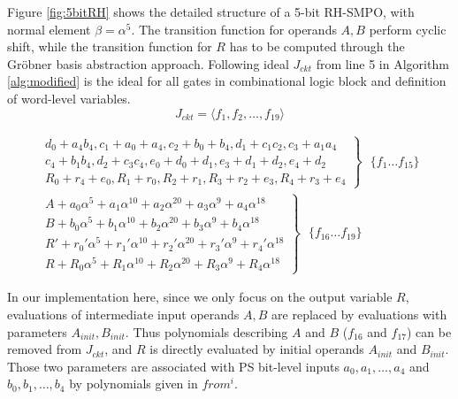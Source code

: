 \begin{Example}
\label{ex:RHSMPO}
Figure \ref{fig:5bitRH} shows the detailed structure of a 5-bit RH-SMPO, with normal element $\beta = \alpha^5$. The transition function for
operands $A,B$ perform cyclic shift, while the transition function for $R$ has to be computed through the Gr\"obner basis
abstraction approach. Following ideal $J_{ckt}$ from line 5 in Algorithm \ref{alg:modified} is the ideal for 
all gates in combinational logic block and definition of word-level variables.
$$J_{ckt} = \langle f_1,f_2,\dots,f_{19}\rangle$$

\begin{eqnarray*}
 \left. 
\begin{aligned}
d_0+a_4b_4, c_1+a_0+a_4, c_2+b_0+b_4, d_1+c_1c_2, c_3+a_1a_4\\
c_4+b_1b_4, d_2+c_3c_4, e_0+d_0+d_1, e_3+d_1+d_2, e_4+d_2 \\
R_0+r_4+e_0, R_1+r_0, R_2+r_1, R_3+r_2+e_3, R_4+r_3+e_4
\end{aligned}\right\} ~~~\{f_1\dots f_{15}\}\\
 \left.
\begin{aligned}
 A+a_0\alpha^5+a_1\alpha^{10}+a_2\alpha^{20}+a_3\alpha^9+a_4\alpha^{18}\\
		  B+b_0\alpha^5+b_1\alpha^{10}+b_2\alpha^{20}+b_3\alpha^9+b_4\alpha^{18}\\
		  R'+r_0'\alpha^5+r_1'\alpha^{10}+r_2'\alpha^{20}+r_3'\alpha^9+r_4'\alpha^{18}\\
		  R+R_0\alpha^5+R_1\alpha^{10}+R_2\alpha^{20}+R_3\alpha^9+R_4\alpha^{18}
		 \end{aligned}\right\} ~~~\{f_{16}\dots f_{19}\}
\end{eqnarray*}

In our implementation here, since we only focus on the output variable $R$, evaluations of intermediate input 
operands $A, B$ are replaced by evaluations with parameters $A_{init},B_{init}$. 
Thus polynomials describing $A$ and $B$ ($f_{16}$ and $f_{17}$) can be removed from $J_{ckt}$, and $R$ is directly
evaluated by initial operands $A_{init}$ and $B_{init}$. Those two parameters are associated with PS bit-level inputs
$a_0,a_1,\dots,a_4$ and $b_0,b_1,\dots,b_4$ by polynomials given in $from^i$.


\end{Example}
